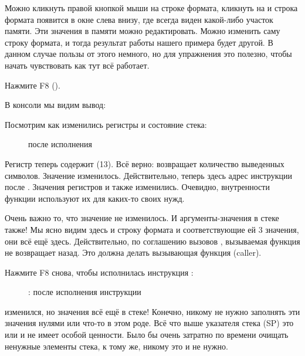 Можно кликнуть правой кнопкой мыши на строке формата, кликнуть на 
и строка формата появится в окне слева внизу, где всегда виден какой-либо участок памяти.
Эти значения в памяти можно редактировать.
Можно изменить саму строку формата, и тогда результат работы нашего примера будет другой.
В данном случае пользы от этого немного, но для упражнения это полезно,
чтобы начать чувствовать как тут всё работает.

\clearpage
Нажмите F8 (\stepover).

В консоли мы видим вывод:



Посмотрим как изменились регистры и состояние стека: 

\begin{figure}[H]
\centering
{}
\caption{\olly после исполнения \printf}
\label{fig:printf3_olly_3}
\end{figure}

Регистр \EAX теперь содержит  (13).
Всё верно: \printf возвращает количество выведенных символов.
Значение \EIP изменилось. Действительно, теперь здесь адрес инструкции после .
Значения регистров \ECX и \EDX также изменились.
Очевидно, внутренности функции \printf используют их для каких-то своих нужд.

Очень важно то, что значение \ESP не изменилось. И аргументы-значения в стеке также!
Мы ясно видим здесь и строку формата и соответствующие ей 3 значения, они всё ещё здесь.
Действительно, по соглашению вызовов , вызываемая функция не возвращает \ESP назад.
Это должна делать вызывающая функция (\gls{caller}).

\clearpage
Нажмите F8 снова, чтобы исполнилась инструкция :

\begin{figure}[H]
\centering
{}
\caption{\olly: после исполнения инструкции }
\label{fig:printf3_olly_4}
\end{figure}

\ESP изменился, но значения всё ещё в стеке!
Конечно, никому не нужно заполнять эти значения нулями или что-то в этом роде.
Всё что выше указателя стека (\ac{SP}) 
это  или \IT{\garbage{}} и не имеет особой ценности.
Было бы очень затратно по времени очищать ненужные элементы стека, к тому же, никому это и не нужно.

